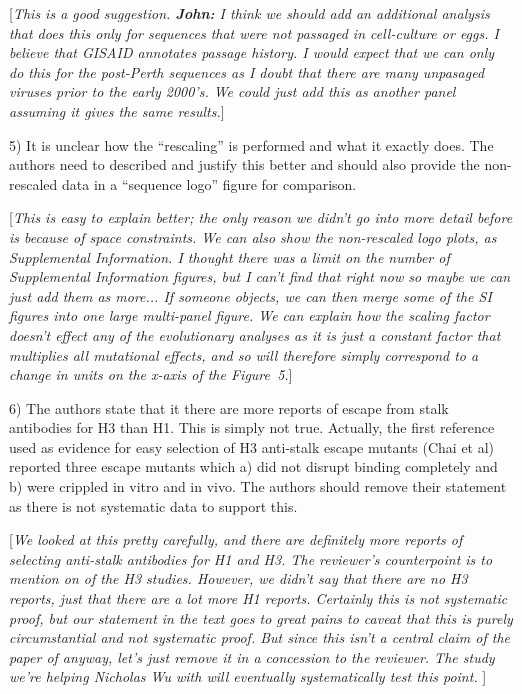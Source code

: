 \documentclass[11pt, oneside]{article}   	%
\newcommand{\comment}[1]{{\color{red}[\textsl{#1}]}}
\begin{document}
\comment{This is a good suggestion. 
{\bf John:} I think we should add an additional analysis that does this only for sequences that were not passaged in cell-culture or eggs.
I believe that GISAID annotates passage history.
I would expect that we can only do this for the post-Perth sequences as I doubt that there are many unpasaged viruses prior to the early 2000's.
We could just add this as another panel assuming it gives the same results.}

5) It is unclear how the ``rescaling'' is performed and what it exactly does. The authors need to described and justify this better and should also provide the non-rescaled data in a ``sequence logo'' figure for comparison. 

\comment{This is easy to explain better; the only reason we didn't go into more detail before is because of space constraints.
We can also show the non-rescaled logo plots, as Supplemental Information.
I thought there was a limit on the number of Supplemental Information figures, but I can't find that right now so maybe we can just add them as more... If someone objects, we can then merge some of the SI figures into one large multi-panel figure.
We can explain how the scaling factor doesn't effect any of the evolutionary analyses as it is just a constant factor that multiplies all mutational effects, and so will therefore simply correspond to a change in units on the x-axis of the Figure~5.}

6) The authors state that it there are more reports of escape from stalk antibodies for H3 than H1. This is simply not true. Actually, the first reference used as evidence for easy selection of H3 anti-stalk escape mutants (Chai et al) reported three escape mutants which a) did not disrupt binding completely and b) were crippled in vitro and in vivo. The authors should remove their statement as there is not systematic data to support this. 

\comment{We looked at this pretty carefully, and there are definitely more reports of selecting anti-stalk antibodies for H1 and H3.
The reviewer's counterpoint is to mention on of the H3 studies. 
However, we didn't say that there are no H3 reports, just that there are a lot more H1 reports.
Certainly this is not systematic proof, but our statement in the text goes to great pains to caveat that this is purely circumstantial and not systematic proof.
But since this isn't a central claim of the paper of anyway, let's just remove it in a concession to the reviewer.
The study we're helping Nicholas Wu with will eventually systematically test this point.
}
\end{document}
